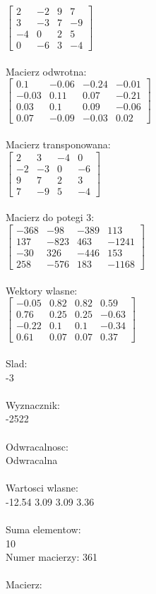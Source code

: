 \documentclass[a4paper,12pt]{article}
\begin{document}
$\begin{bmatrix} 2&-2&9&7\\3&-3&7&-9\\-4&0&2&5\\0&-6&3&-4 \end{bmatrix}$
\\
\\
Macierz odwrotna:\\

$\begin{bmatrix} 0.1&-0.06&-0.24&-0.01\\-0.03&0.11&0.07&-0.21\\0.03&0.1&0.09&-0.06\\0.07&-0.09&-0.03&0.02 \end{bmatrix}$
\\
\\
Macierz transponowana:\\

$\begin{bmatrix} 2&3&-4&0\\-2&-3&0&-6\\9&7&2&3\\7&-9&5&-4 \end{bmatrix}$
\\
\\
Macierz do potegi 3:\\

$\begin{bmatrix} -368&-98&-389&113\\137&-823&463&-1241\\-30&326&-446&153\\258&-576&183&-1168 \end{bmatrix}$
\\
\\
Wektory wlasne:\\

$\begin{bmatrix} -0.05&0.82&0.82&0.59\\0.76&0.25&0.25&-0.63\\-0.22&0.1&0.1&-0.34\\0.61&0.07&0.07&0.37 \end{bmatrix}$
\\
\\
Slad:\\
-3
\\
\\
Wyznacznik:\\
-2522
\\
\\
Odwracalnosc:\\
Odwracalna
\\
\\
Wartosci wlasne:\\
-12.54 3.09 3.09 3.36
\\
\\
Suma elementow:\\
10
\\
\newpage
Numer macierzy:
361
\\
\\
Macierz:\\
\end{document}
